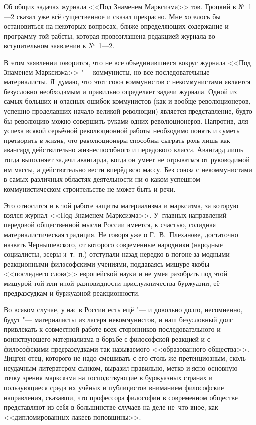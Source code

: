 Об общих задачах журнала <<Под Знаменем Марксизма>> тов. Троцкий в №~1---2
сказал уже всё существенное и сказал прекрасно. Мне хотелось бы
остановиться на некоторых вопросах, ближе определяющих содержание и
программу той работы, которая провозглашена редакцией журнала во
вступительном заявлении к №~1---2.

В этом заявлении говорится, что не все объединившиеся вокруг журнала <<Под
Знаменем Марксизма>> "--- коммунисты, но все последовательные материалисты.
Я~думаю, что этот союз коммунистов с некоммунистами является безусловно
необходимым и правильно определяет задачи журнала. Одной из самых больших и
опасных ошибок коммунистов (как и вообще революционеров, успешно
проделавших начало великой революции) является представление, будто бы
революцию можно совершить руками одних революционеров. Напротив, для успеха
всякой серьёзной революционной работы необходимо понять и суметь претворить
в жизнь, что революционеры способны сыграть роль лишь как авангард
действительно жизнеспособного и передового класса. Авангард лишь тогда
выполняет задачи авангарда, когда он умеет не отрываться от руководимой им
массы, а действительно вести вперёд всю массу. Без союза с некоммунистами в
самых различных областях деятельности ни о каком успешном коммунистическом
строительстве не может быть и речи.

Это относится и к той работе защиты материализма и марксизма, за которую
взялся журнал <<Под Знаменем Марксизма>>. У~главных направлений передовой
общественной мысли России имеется, к счастью, солидная материалистическая
традиция. Не говоря уже о Г.~В.~Плеханове, достаточно назвать
Чернышевского, от которого современные народники (народные социалисты,
эсеры и~т.~п.) отступали назад нередко в погоне за модными реакционными
философскими учениями, поддаваясь мишуре якобы <<последнего слова>>
европейской науки и не умея разобрать под этой мишурой той или иной
разновидности прислужничества буржуазии, её предразсудкам и буржуазной
реакционности.

Во всяком случае, у нас в России есть ещё "--- и довольно долго, несомненно,
будут "--- материалисты из лагеря некоммунистов, и наш безусловный долг
привлекать к совместной работе всех сторонников последовательного и
воинствующего материализма в борьбе с философской реакцией и с философскими
предразсудками так называемого <<образованного общества>>. Дицген-отец,
которого не надо смешивать с его столь же претенциозным, сколь неудачным
литератором-сынком, выразил правильно, метко и ясно основную точку зрения
марксизма на господствующие в буржуазных странах и пользующиеся среди их
учёных и публицистов вниманием философские направления, сказавши, что
профессора философии в современном обществе представляют из себя в
большинстве случаев на деле не~что иное, как <<дипломированных лакеев
поповщины>>.

